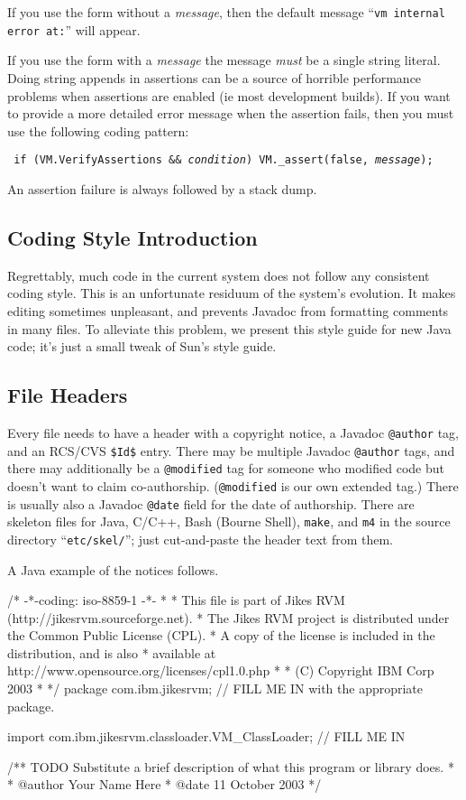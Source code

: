 If you use the form without a {\it message}, then the default message
``{\tt vm internal error at:}''  will appear.  

If you use the form with a {\it message} the message {\em must} be a
single string literal.  Doing string appends in assertions can be a
source of horrible performance problems when assertions are enabled
(ie most development builds).  If you want to provide a
more detailed error message when the assertion fails, then you must
use the following coding pattern:
\begin{example}
\tt{}   if (VM.VerifyAssertions && {\it condition}) VM._assert(false, {\it message});
\end{example}

An assertion failure is always followed by a stack dump.


\subsection{Coding Style Introduction}

Regrettably, much code in the current system does not follow any
consistent coding style.  This is an unfortunate residuum of the
system's evolution.  It makes editing sometimes unpleasant, and
prevents Javadoc\TMweb{} from formatting comments in many files.  To alleviate
this problem, we present this style guide for new Java\TMweb{} code; it's just
a small tweak of Sun\Rweb{}'s style guide.

\subsection{File Headers}

Every file needs to have a header with a copyright notice, a Javadoc\TMweb{}
{\tt @author} tag, and an RCS/CVS {\tt \$Id\$} entry. There may be
multiple Javadoc {\tt @author} tags, and there may
additionally be a {\tt @modified} tag for someone who modified code but
doesn't want to claim co-authorship.  ({\tt @modified} is our own
extended tag.)  There is usually also a Javadoc {\tt @date} field for
the date of authorship.  There are skeleton files for Java, C/C++,
Bash (Bourne Shell), \texttt{make}, and \texttt{m4} in the source directory
``\texttt{etc/skel/}''; just cut-and-paste the header text from them.  

A Java example of the notices follows.

\begin{example}
/* -*-coding: iso-8859-1 -*-
 *
 * This file is part of Jikes RVM (http://jikesrvm.sourceforge.net).
 * The Jikes RVM project is distributed under the Common Public License (CPL).
 * A copy of the license is included in the distribution, and is also
 * available at http://www.opensource.org/licenses/cpl1.0.php
 *
 * (C) Copyright IBM Corp 2003
 *
 */
package com.ibm.jikesrvm;       // FILL ME IN with the appropriate package.

import com.ibm.jikesrvm.classloader.VM_ClassLoader; // FILL ME IN 

/** TODO Substitute a brief description of what this program or library does.
 *
 * @author Your Name Here
 * @date 11 October 2003
 */
\end{example}

